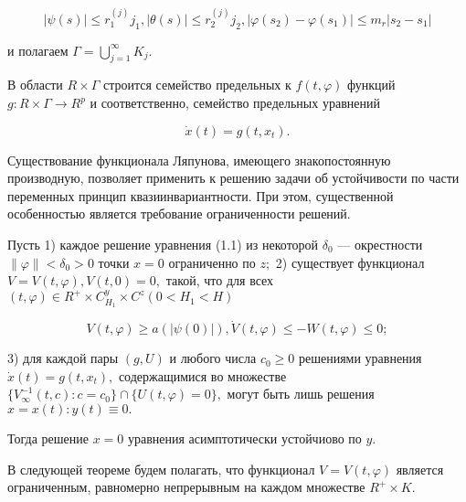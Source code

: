 		\begin{equation}
		| \psi(s) | \le r^{(j)}_1 j_1, | \theta (s) | \le r^{(j)}_2 j_2, | \varphi(s_2) - \varphi(s_1) | \le m_r | s_2 - s_1 | 
		\end{equation}
		
		и полагаем $ \Gamma = \bigcup\limits_{j=1}^{\infty } {K_j}.$
		
		В области $R \times \Gamma$ строится семейство предельных к $f(t, \varphi)$ функций $g : R \times \Gamma \to R^p$ и соответственно, семейство предельных уравнений
		
		\begin{equation}
		\dot x(t) = g(t, x_t).
		\end{equation}
		
		Существование функционала Ляпунова, имеющего знакопостоянную производную, позволяет применить к решению задачи об устойчивости по части переменных принцип квазиинвариантности. При этом, существенной особенностью является требование ограниченности решений.
		
		\begin{theorem}\label{t-1.11} Пусть 
			1) каждое решение уравнения (1.1) из некоторой $\delta_0$ --- окрестности $ \| \varphi \| < \delta_0 > 0$ точки $x = 0$ ограниченно по $z;$
			2) существует функционал $V = V(t, \varphi), V(t, 0) = 0,$ такой, что для всех $ (t, \varphi) \in R^+ \times C^y_{H_1} \times C^z (0 < H_1 < H)$
			
			\begin{equation}
			V(t, \varphi) \ge a(| \psi(0) |), \dot V (t, \varphi) \le - W(t, \varphi) \le 0;
			\end{equation}
			
			3) для каждой пары $ (g, U) $ и любого числа $c_0 \ge 0$ решениями уравнения $\dot x(t) = g(t, x_t), $ содержащимися во множестве $ \lbrace V_{\infty}^{-1}(t, c) : c = c_0 \rbrace \cap \lbrace U(t, \varphi) = 0 \rbrace, $ могут быть лишь решения $x = x(t) : y(t) \equiv 0.$
			
			Тогда решение $x = 0$ уравнения асимптотически устойчиово по $y.$
			
		\end{theorem}
		
		В следующей теореме будем полагать, что функционал $V = V(t, \varphi)$ является ограниченным, равномерно непрерывным на каждом множестве $R^+ \times K.$ 
		

